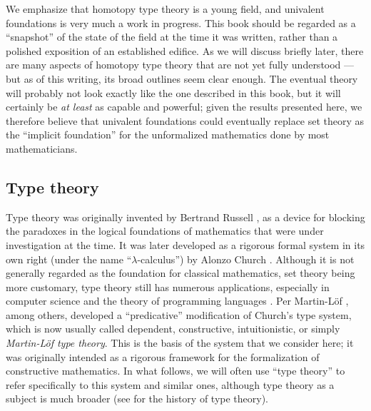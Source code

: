 We emphasize that homotopy type theory is a young field, and univalent foundations is very much a work in progress.
This book should be regarded as a ``snapshot'' of the state of the field at the time it was written, rather than a polished exposition of an established edifice.
As we will discuss briefly later, there are many aspects of homotopy type theory that are not yet fully understood --- but as of this writing, its broad outlines seem clear enough.
The eventual theory will probably not look exactly like the one described in this book, but it will certainly be \emph{at least} as capable and powerful; given the results presented here, we therefore believe that univalent foundations could eventually replace set theory as the ``implicit foundation'' for the unformalized mathematics done by most mathematicians.


\subsection*{Type theory}

Type theory was originally invented by Bertrand Russell \cite{Russell:1908}, as a device for blocking the paradoxes in the logical foundations of mathematics  that were under investigation at the time. It was later developed as a rigorous formal system in its own right (under the name ``$\lambda$-calculus'') by Alonzo Church \cite{Church:1933cl,Church:1940tu,Church:1941tc}.  Although it is not generally regarded as the foundation for classical mathematics, set theory being more customary, type theory still has numerous applications, especially in computer science and the theory of programming languages \cite{Pierce-TAPL}.   Per Martin-L\"{o}f \cite{Martin-Lof-1972,martinlof71itt,Martin-Lof-1979,martin-lof:bibliopolis}, among others,
developed a ``predicative'' modification of Church's type system, which is now usually called dependent, constructive, intuitionistic, or simply \emph{Martin\--L\"of type theory}. This is the basis of the system that we consider here; it was originally intended as a rigorous framework for the formalization of constructive mathematics.  In what follows, we will often use ``type theory'' to refer specifically to this system and similar ones, although type theory as a subject is much broader (see \cite{somma,kamar} for the history of type theory).

